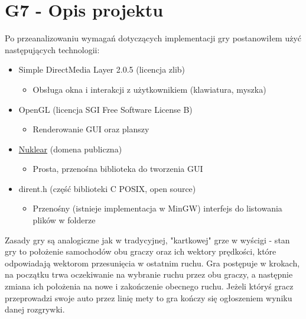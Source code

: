 \documentclass[10pt,a4paper]{report}
\begin{document}
\section{G7 - Opis projektu}
Po przeanalizowaniu wymagań dotyczących implementacji gry postanowiłem użyć następujących technologii:
\begin{itemize}
	\item Simple DirectMedia Layer 2.0.5 (licencja zlib)
	\begin{itemize}
	\item Obsługa okna i interakcji z użytkownikiem (klawiatura, myszka)
	\end{itemize}
	\item OpenGL (licencja SGI Free Software License B)
	\begin{itemize}
	\item Renderowanie GUI oraz planszy
	\end{itemize}
	\item  \href{https://github.com/vurtun/nuklear}{Nuklear} (domena publiczna)
	\begin{itemize}
	\item Prosta, przenośna biblioteka do tworzenia GUI
	\end{itemize}
	\item dirent.h (część biblioteki C POSIX, open source)
	\begin{itemize}
	\item Przenośny (istnieje implementacja w MinGW) interfejs do listowania plików w folderze
	\end{itemize}
\end{itemize}
\par Zasady gry są analogiczne jak w tradycyjnej, "kartkowej" grze w wyścigi - stan gry to położenie samochodów obu graczy oraz ich wektory prędkości, które odpowiadają wektorom przesunięcia w ostatnim ruchu. Gra postępuje w krokach, na początku trwa oczekiwanie na wybranie ruchu przez obu graczy, a następnie zmiana ich położenia na nowe i zakończenie obecnego ruchu. Jeżeli któryś gracz przeprowadzi swoje auto przez linię mety to gra kończy się ogłoszeniem wyniku danej rozgrywki. \par
\end{document}
